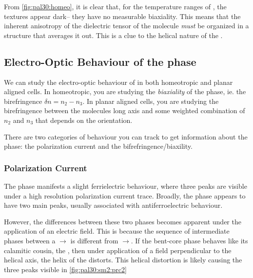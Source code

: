 \documentclass[aagreenthesis]{subfiles}
\begin{document}
From \autoref{fig:pal30:homeo}, it is clear that, for the temperature ranges of
\smcpalpha, the textures appear dark-- they have no measurable biaxiality. This
means that the inherent anisotropy of the dielectric tensor of the molecule
\textit{must} be organized in a structure that averages it out. This is a clue
to the helical nature of the \smcpalpha{}. 



        
\subsection{Electro-Optic Behaviour of the \smcpalpha{} phase}
We can study the electro-optic behaviour of \nfour{} in both homeotropic and
planar aligned cells. In homeotropic, you are studying the \textit{biaxiality}
of the phase, ie. the birefringence $\delta n = n_2-n_3$. In planar aligned
cells, you are studying the birefringence between the molecules long axis and
some weighted combination of $n_2$ and $n_3$ that depends on the orientation.

There are two categories of behaviour you can track to get information about the
phase: the polarization current and the bifrefringence/biaxility.

\subsubsection{Polarization Current}
The \smcpalpha{} phase manifests a slight ferrielectric behaviour, where three
peaks are visible under a high resolution polarization current trace. Broadly,
the phase appears to have two main peaks, usually associated with
antiferroelectric behaviour.

However, the differences between these two phases becomes apparent under the
application of an electric field. This is because the sequence of intermediate
phases between a \smcapa{}$\rightarrow$\smcspf{} is different from
\smcpalpha{}$\rightarrow$\smcspf{}. If the bent-core \smcpalpha{} phase behaves
like its calamitic cousin, the \smcalpha{}, then under application of a field
perpendicular to the helical axis, the helix of the \smcpalpha{} distorts. This
helical distortion is likely causing the three peaks visible in
\autoref{fig:pal30:sm2:prc2}
\end{document}
